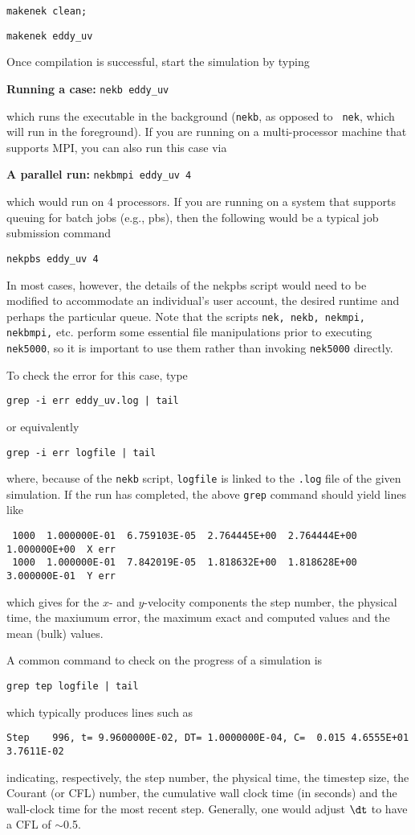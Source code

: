 {\tt makenek clean;}  

{\tt makenek eddy\_uv} 

\noindent
Once compilation is successful, start the simulation by typing
 

{\bf Running a case:}
{\tt nekb eddy\_uv } 

which runs the executable in the background ({\tt nekb}, as opposed to {\tt
nek}, which will run in the foreground).  
If you are running on a multi-processor machine that supports MPI, you
can also run this case via

{\bf A parallel run:}
{\tt nekbmpi eddy\_uv 4}

\noindent
which would run on 4 processors.    If you are running on a system
that supports queuing for batch jobs (e.g., pbs), then the following
would be a typical job submission command

{\tt nekpbs eddy\_uv 4}

In most cases, however, the details of the nekpbs script would need
to be modified to accommodate an individual's user account, the 
desired runtime and perhaps the particular queue.   Note that the
scripts {\tt nek, nekb, nekmpi, nekbmpi,} etc. perform some essential
file manipulations prior to executing {\tt nek5000}, so it is important
to use them rather than invoking {\tt nek5000} directly.


To check the error for this case, type
\begin{verbatim}
grep -i err eddy_uv.log | tail
\end{verbatim}
or equivalently
\begin{verbatim}
grep -i err logfile | tail
\end{verbatim}
where, because of the {\tt nekb} script, {\tt logfile} is 
linked to the {\tt .log} file of the given simulation. 
If the run has completed, the above {\tt grep} command should yield lines like
\scriptsize
\begin{verbatim}
 1000  1.000000E-01  6.759103E-05  2.764445E+00  2.764444E+00  1.000000E+00  X err
 1000  1.000000E-01  7.842019E-05  1.818632E+00  1.818628E+00  3.000000E-01  Y err
\end{verbatim}
\normalsize
which gives for the $x$- and $y$-velocity components the 
step number, the physical time, the maxiumum error, the maximum exact
and computed values and the mean (bulk) values.

A common command to check on the progress of a simulation is
\begin{verbatim}
grep tep logfile | tail
\end{verbatim}
which typically produces lines such as
\scriptsize
\begin{verbatim}
Step    996, t= 9.9600000E-02, DT= 1.0000000E-04, C=  0.015 4.6555E+01 3.7611E-02
\end{verbatim}
\normalsize
indicating, respectively, the step number, the physical time, the
timestep size, the Courant (or CFL) number, the cumulative wall clock time (in seconds)
and the wall-clock time for the most recent step.   Generally, one would 
adjust $\dt$ to have a CFL of $\sim$0.5.  


